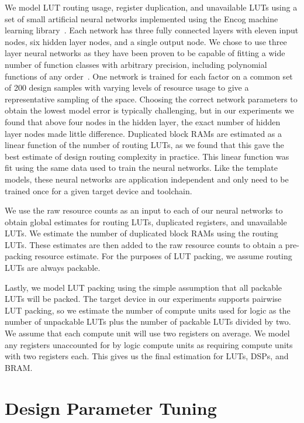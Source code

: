 We model LUT routing usage, register duplication, and unavailable LUTs using a set of small artificial
neural networks implemented using the Encog machine learning library~\cite{encog}.
Each network has three fully connected layers with eleven input nodes, six hidden layer nodes, and a single output node. We chose to use
three layer neural networks as they have been proven to be capable of fitting a wide number of function classes with arbitrary precision, including polynomial functions of any order~\cite{science}.
One network is trained
for each factor on a common set of 200 design samples with varying levels of resource usage to give a representative sampling of the space. Choosing the correct
network parameters to obtain the lowest model error is typically challenging, but in our experiments we found that above four nodes in the hidden layer,
the exact number of hidden layer nodes made little difference.
Duplicated block RAMs are estimated as a linear function of the number of routing LUTs, as we found that this gave the best estimate of design routing complexity in practice. This linear function was fit using the same data used to train the neural networks. Like the template models, these neural networks are application independent and only need to be trained once for a given target device and toolchain.

We use the raw resource counts as an input to each of our neural networks to obtain global estimates for routing LUTs,
duplicated registers, and unavailable LUTs. We estimate the number of duplicated block RAMs using the routing LUTs.
These estimates are then added to the raw resource counts to obtain a pre-packing resource estimate. For the purposes
of LUT packing, we assume routing LUTs are always packable.

Lastly, we model LUT packing using the simple assumption that all packable LUTs will be packed. The target device
in our experiments supports pairwise LUT packing, so we estimate the number of compute units used for logic as
the number of unpackable LUTs plus the number of packable LUTs divided by two. We assume that each compute unit
will use two registers on average. We model any registers unaccounted for by logic compute units as requiring
compute units with two registers each. This gives us the final estimation for LUTs, DSPs, and BRAM.

\section{Design Parameter Tuning}
\label{dse}

